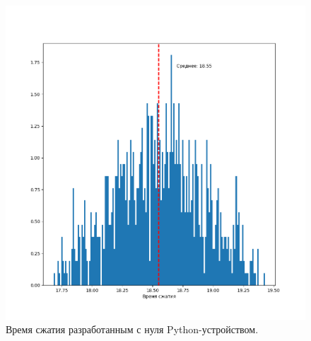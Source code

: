 \begin{figure}[!htbp]
    \centering
    \begin{adjustbox}{max totalsize={\textwidth}{\textheight}}
        \includegraphics{images/hist-handmade-py-dev.png}
    \end{adjustbox}
    \caption{Время сжатия разработанным с нуля Python-устройством.}\label{fig:hist-handmade-py-dev}
\end{figure}


